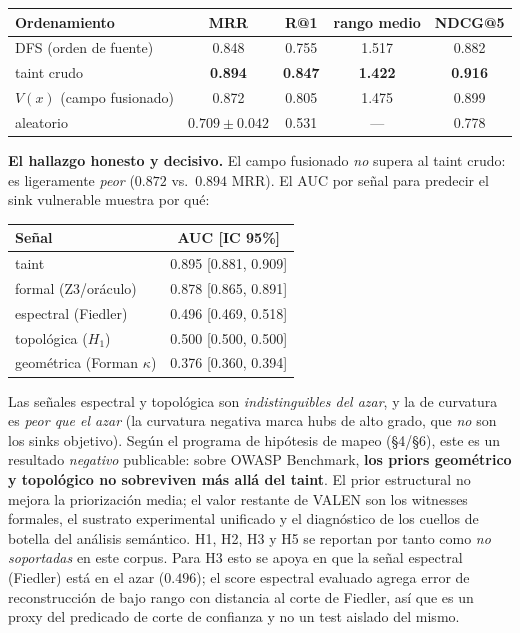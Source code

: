\documentclass[11pt]{article}
\begin{document}
\begin{center}
\small
\begin{tabular}{lcccc}
\toprule
Ordenamiento & MRR & R@1 & rango medio & NDCG@5 \\
\midrule
DFS (orden de fuente) & 0.848 & 0.755 & 1.517 & 0.882 \\
taint crudo & \textbf{0.894} & \textbf{0.847} & \textbf{1.422} & \textbf{0.916} \\
$V(x)$ (campo fusionado) & 0.872 & 0.805 & 1.475 & 0.899 \\
aleatorio & $0.709\pm0.042$ & 0.531 & --- & 0.778 \\
\bottomrule
\end{tabular}
\end{center}

\noindent\textbf{El hallazgo honesto y decisivo.} El campo fusionado \emph{no}
supera al taint crudo: es ligeramente \emph{peor} ($0.872$ vs.\ $0.894$ MRR). El
AUC por señal para predecir el sink vulnerable muestra por qué:

\begin{center}
\small
\begin{tabular}{lc}
\toprule
Señal & AUC [IC 95\%] \\
\midrule
taint & 0.895 [0.881, 0.909] \\
formal (Z3/oráculo) & 0.878 [0.865, 0.891] \\
espectral (Fiedler) & 0.496 [0.469, 0.518] \\
topológica ($H_1$) & 0.500 [0.500, 0.500] \\
geométrica (Forman $\kappa$) & 0.376 [0.360, 0.394] \\
\bottomrule
\end{tabular}
\end{center}

Las señales espectral y topológica son \emph{indistinguibles del azar}, y la de
curvatura es \emph{peor que el azar} (la curvatura negativa marca hubs de alto
grado, que \emph{no} son los sinks objetivo). Según el programa de hipótesis de
mapeo (§4/§6), este es un resultado \emph{negativo} publicable: sobre OWASP
Benchmark, \textbf{los priors geométrico y topológico no sobreviven más allá del
taint}. El prior estructural no mejora la priorización media; el valor restante de
VALEN son los witnesses formales, el sustrato experimental unificado y el
diagnóstico de los cuellos de botella del análisis semántico. H1, H2, H3 y H5 se
reportan por tanto como \emph{no soportadas} en este corpus. Para H3 esto se
apoya en que la señal espectral (Fiedler) está en el azar ($0.496$); el score
espectral evaluado agrega error de reconstrucción de bajo rango con distancia al
corte de Fiedler, así que es un proxy del predicado de corte de confianza y no un
test aislado del mismo.
\end{document}
